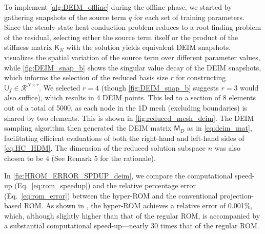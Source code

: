 \documentclass[11pt]{article}
\newcommand{\mat}[1]{\mathsf{#1}}
\begin{document}
        To implement \cref{alg:DEIM_offline} during the offline phase, we started by gathering snapshots of the source term \( q \) for each set of training parameters.
        Since the steady-state heat conduction problem reduces to a root-finding problem of the residual, selecting either the source term itself or the product of the stiffness matrix $\mat{K}_N$ with the solution yields equivalent DEIM snapshots.
         visualizes the spatial variation of the source term over different parameter values, while \cref{fig:DEIM_snap_b} shows the singular value decay of the DEIM snapshots, which informs the selection of the reduced basis size \( r \) for constructing \( \mathbb{U}_f \in \mathcal{R}^{N \times r} \).
        We selected \( r = 4 \) (though \cref{fig:DEIM_snap_b} suggests $r=3$ would also suffice), which results in 4 DEIM points.
        This led to a section of 8 elements out of a total of 5000, as each node in the 1D mesh (excluding boundaries) is shared by two elements.
        This is shown in \cref{fig:reduced_mesh_deim}.
        The DEIM sampling algorithm then generated the DEIM matrix \( \mathsf{M}_D \) as in \cref{eq:deim_mat}, facilitating efficient evaluations of both the right-hand and left-hand sides of \cref{eq:HC_HDM}.
        The dimension of the reduced solution subspace $n$ was also chosen to be $4$ (See Remark 5 for the rationale).


        In \cref{fig:HROM_ERROR_SPDUP_deim}, we compare the computational speed-up (Eq.~\ref{eq:rom_speedup}) and the relative percentage error (Eq.~\ref{eq:rom_error}) between the hyper-ROM and the conventional projection-based ROM.
        As shown in , the hyper-ROM achieves a relative error of 0.001\%, which, although slightly higher than that of the regular ROM, is accompanied by a substantial computational speed-up—nearly 30 times that of the regular ROM.
\end{document}

